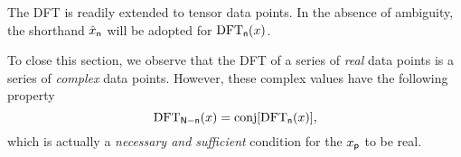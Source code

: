 The DFT is readily extended to tensor data points. In the absence of ambiguity,
the shorthand \(\hat{x}_{\mathsf{n}}\) will be adopted for
\(\operatorname{DFT}_{\mathsf{n}}(x)\).

To close this section, we observe that the DFT of a series of \emph{real} data
points is a series of \emph{complex} data points. However, these complex values
have the following property
\begin{equation}
\operatorname{DFT}_{\mathsf{N}-\mathsf{n}}(x)=\operatorname{conj}[\operatorname{DFT}_{\mathsf{n}}(x)],
\end{equation}
which is actually a \emph{necessary and sufficient} condition for the
\(x_{\mathsf{p}}\) to be real.
